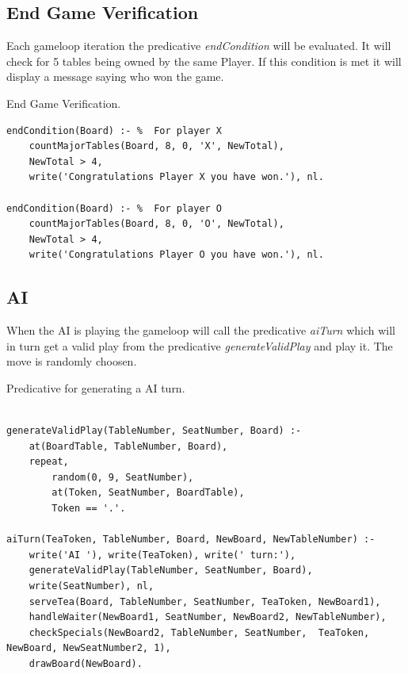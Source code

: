 \documentclass[a4paper]{article}
\begin{document}
\subsection{End Game Verification}
 Each gameloop iteration the predicative \textit{endCondition} will be evaluated. It will check for 5 tables being owned by the same Player. If this condition is met it will
  display a message saying who won the game.

\renewcommand\listingscaption{Code}

\begin{listing}[H]
    \caption{End Game Verification.}
    \label{Codigo:cod_end}
    \begin{verbatim}
endCondition(Board) :- %  For player X
    countMajorTables(Board, 8, 0, 'X', NewTotal),
    NewTotal > 4,
    write('Congratulations Player X you have won.'), nl.

endCondition(Board) :- %  For player O
    countMajorTables(Board, 8, 0, 'O', NewTotal),
    NewTotal > 4,
    write('Congratulations Player O you have won.'), nl.

\end{verbatim}

\end{listing}

\subsection{AI}
    When the AI is playing the gameloop will call the predicative \textit{aiTurn} which will in turn get a valid play
    from the predicative \textit{generateValidPlay} and play it. The move is randomly choosen.

\begin{listing}[H]
    \caption{Predicative for generating a AI turn.}
    \label{Codigo:cod_ai}
    \begin{verbatim}

generateValidPlay(TableNumber, SeatNumber, Board) :-
    at(BoardTable, TableNumber, Board),
    repeat,
        random(0, 9, SeatNumber),
        at(Token, SeatNumber, BoardTable),
        Token == '.'.

aiTurn(TeaToken, TableNumber, Board, NewBoard, NewTableNumber) :-
    write('AI '), write(TeaToken), write(' turn:'),
    generateValidPlay(TableNumber, SeatNumber, Board),
    write(SeatNumber), nl,
    serveTea(Board, TableNumber, SeatNumber, TeaToken, NewBoard1),
    handleWaiter(NewBoard1, SeatNumber, NewBoard2, NewTableNumber),
    checkSpecials(NewBoard2, TableNumber, SeatNumber,  TeaToken, NewBoard, NewSeatNumber2, 1),
    drawBoard(NewBoard).

\end{verbatim}

\end{listing}
\end{document}
